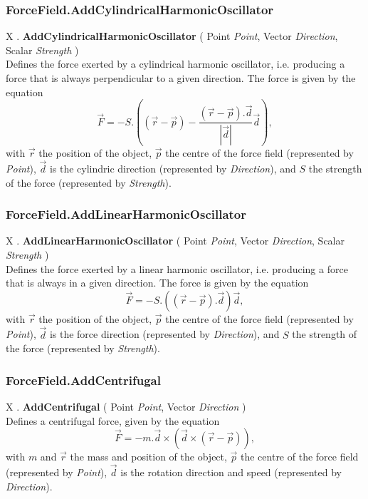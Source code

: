 \documentclass[10pt]{book}
\newcommand{\var}[1]{\textit{#1}}
\begin{document}
\subsubsection{ForceField.AddCylindricalHarmonicOscillator \label{F:ForceField:AddCylindricalHarmonicOscillator}}
X . \textbf{AddCylindricalHarmonicOscillator} ( Point \textit{Point}, Vector \textit{Direction}, Scalar \textit{Strength} ) \\
Defines the force exerted by a cylindrical harmonic oscillator, i.e. producing a force that is always perpendicular to a given direction.
The force is given by the equation
\begin{equation}
\vec{F}= - S . 
\left(
(\vec{r}-\vec{p})
- \frac{(\vec{r}-\vec{p}). \vec{d}}{|\vec{d}|} \vec{d}
\right)
,
\end{equation}
with $\vec{r}$ the position of the object, $\vec{p}$ the centre of the force field (represented by \var{Point}), $\vec{d}$ is the cylindric direction (represented by \var{Direction}), and $S$ the strength of the force (represented by \var{Strength}).



\subsubsection{ForceField.AddLinearHarmonicOscillator \label{F:ForceField:AddLinearHarmonicOscillator}}
X . \textbf{AddLinearHarmonicOscillator} ( Point \textit{Point}, Vector \textit{Direction}, Scalar \textit{Strength} ) \\
Defines the force exerted by a linear harmonic oscillator, i.e. producing a force that is always in a given direction.
The force is given by the equation
\begin{equation}
\vec{F}= - S . 
((\vec{r}-\vec{p}). \vec{d}) \vec{d}
,
\end{equation}
with $\vec{r}$ the position of the object, $\vec{p}$ the centre of the force field (represented by \var{Point}), $\vec{d}$ is the force direction (represented by \var{Direction}), and $S$ the strength of the force (represented by \var{Strength}).



\subsubsection{ForceField.AddCentrifugal \label{F:ForceField:AddCentrifugal}}
X . \textbf{AddCentrifugal} ( Point \textit{Point}, Vector \textit{Direction} ) \\
Defines a centrifugal force, given by the equation
\begin{equation}
\vec{F}= - m . \vec{d} \times ( \vec{d} \times (\vec{r}-\vec{p}) )
,
\end{equation}
with $m$ and $\vec{r}$ the mass and position of the object, $\vec{p}$ the centre of the force field (represented by \var{Point}), $\vec{d}$ is the rotation direction and speed (represented by \var{Direction}).
\end{document}
